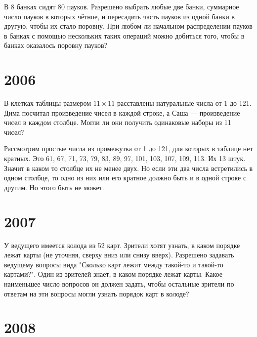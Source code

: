 \documentclass[11pt, a4paper]{template}
\begin{document}
\begin{exercise}[M1847]
В 8 банках сидят 80 пауков. Разрешено выбрать любые две банки, суммарное число пауков в которых чётное, и пересадить часть пауков из одной банки в другую, чтобы их стало поровну. При любом ли начальном распределении пауков в банках с помощью нескольких таких операций можно добиться того, чтобы в банках оказалось поровну пауков?
\end{exercise}

\chapter{2006}

\begin{exercise}[M1981]
В клетках таблицы размером $11 \times 11$ расставлены натуральные числа от 1 до 121. Дима посчитал произведение чисел в каждой строке, а Саша — произведение чисел в каждом столбце. Могли ли они получить одинаковые наборы из 11 чисел?
\end{exercise}

\begin{solution}
Рассмотрим простые числа из промежутка от 1 до 121, для которых в таблице нет кратных. Это 61, 67, 71, 73, 79, 83, 89, 97, 101, 103, 107, 109, 113. Их 13 штук. Значит в каком то столбце их не менее двух. Но если эти два числа встретились в одном столбце, то одно из них или его кратное должно быть и в одной строке с другим. Но этого быть не может.  
\end{solution}

\chapter{2007}

\begin{exercise}[M2033]
У ведущего имеется колода из 52 карт. Зрители хотят узнать, в каком порядке лежат карты (не уточняя, сверху вниз или снизу вверх). Разрешено задавать ведущему вопросы вида "Сколько карт лежит между такой-то и такой-то картами?". Один из зрителей знает, в каком порядке лежат карты. Какое наименьшее число вопросов он должен задать, чтобы остальные зрители по ответам на эти вопросы могли узнать порядок карт в колоде?
\end{exercise}

\chapter{2008}
\end{document}
